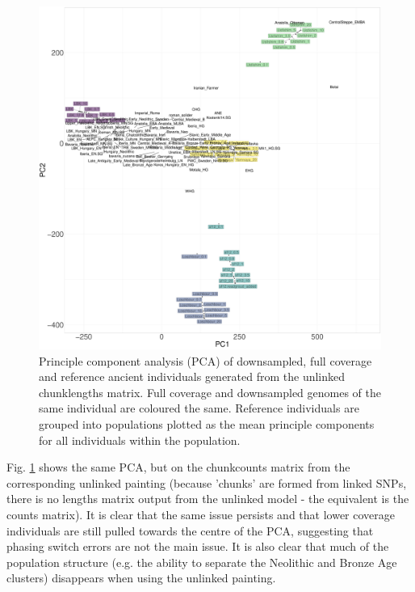 \begin{figure}[htp]
    \centering
    \includegraphics[width=1.0\textwidth]{../images/chapter1/PCA_panel_allInds_unlinked.allCoverage.pdf}
    \caption{Principle component analysis (PCA) of downsampled, full coverage and reference ancient individuals generated from the unlinked chunklengths matrix. Full coverage and downsampled genomes of the same individual are coloured the same. Reference individuals are grouped into populations plotted as the mean principle components for all individuals within the population.}
    \label{fig:PCA_panel_allInds_unlinked.allCoverage}
\end{figure}

Fig. \ref{fig:PCA_panel_allInds_unlinked.allCoverage} shows the same PCA, but on the chunkcounts matrix from the corresponding unlinked painting (because 'chunks' are formed from linked SNPs, there is no lengths matrix output from the unlinked model - the equivalent is the counts matrix). It is clear that the same issue persists and that lower coverage individuals are still pulled towards the centre of the PCA, suggesting that phasing switch errors are not the main issue. It is also clear that much of the population structure (e.g. the ability to separate the Neolithic and Bronze Age clusters) disappears when using the unlinked painting.



